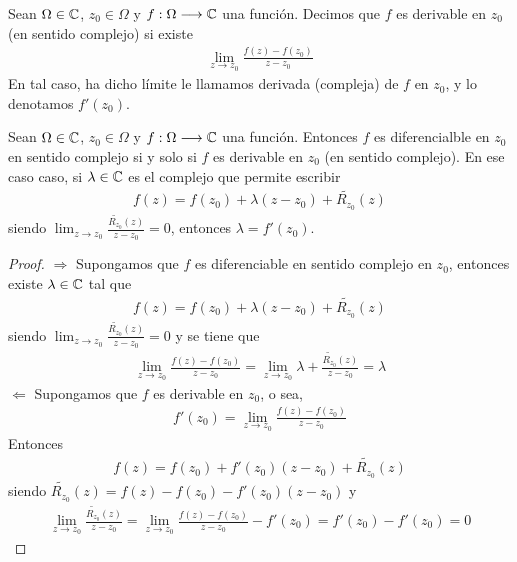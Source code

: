 \begin{defi}
    Sean $\Omega \in \mathbb{C}$, $z_0 \in \Omega$ y $f : \Omega \longrightarrow \mathbb{C}$ una función. Decimos que $f$ es derivable en $z_0$ (en sentido complejo) si existe
    \begin{align*}
        \lim_{z \to z_0}{\frac{f(z) - f(z_0)}{z - z_0}}
    \end{align*}
    En tal caso, ha dicho límite le llamamos derivada (compleja) de $f$ en $z_0$, y lo denotamos $f'(z_0)$.
\end{defi}

\begin{prop}
    Sean $\Omega \in \mathbb{C}$, $z_0 \in \Omega$ y $f : \Omega \longrightarrow \mathbb{C}$ una función. Entonces $f$ es diferencialble en $z_0$ en sentido complejo si y solo si $f$ es derivable en $z_0$ (en sentido complejo). En ese caso caso, si $\lambda \in \mathbb{C}$ es el complejo que permite escribir
    \begin{align*}
        f(z) = f(z_0) + \lambda (z - z_0) + \widetilde{R_{z_0}}(z)
    \end{align*}
    siendo $\lim_{z \to z_0}{\frac{\widetilde{R_{z_0}}(z)}{z - z_0} = 0}$, entonces $\lambda = f'(z_0)$.
\end{prop}

\begin{proof}
    $\Longrightarrow$ Supongamos que $f$ es diferenciable en sentido complejo en $z_0$, entonces existe $\lambda \in \mathbb{C}$ tal que
    \begin{align*}
        f(z) = f(z_0) + \lambda (z - z_0) + \widetilde{R_{z_0}}(z)
    \end{align*}
    siendo $\lim_{z \to z_0}{\frac{\widetilde{R_{z_0}}(z)}{z - z_0} = 0}$ y se tiene que
    \begin{align*}
        \lim_{z \to z_0}{\frac{f(z) - f(z_0)}{z -z_0}} = \lim_{z \to z_0}{\lambda + \frac{\widetilde{R_{z_0}}(z)}{z - z_0}} = \lambda
    \end{align*}
    $\Longleftarrow$ Supongamos que $f$ es derivable en $z_0$, o sea,
    \begin{align*}
        f'(z_0) = \lim_{z \to z_0}{\frac{f(z) - f(z_0)}{z -z_0}}
    \end{align*}
    Entonces
    \begin{align*}
        f(z) = f(z_0) + f'(z_0)(z - z_0) + \widetilde{R_{z_0}}(z)
    \end{align*}
    siendo $\widetilde{R_{z_0}}(z) =  f(z) - f(z_0) - f'(z_0)(z - z_0)$ y
    \begin{align*}
        \lim_{z \to z_0}{\frac{\widetilde{R_{z_0}}(z)}{z -z_0}} = \lim_{z \to z_0}{\frac{f(z) - f(z_0)}{z - z_0}} - f'(z_0) = f'(z_0) - f'(z_0) = 0
    \end{align*}
\end{proof}

